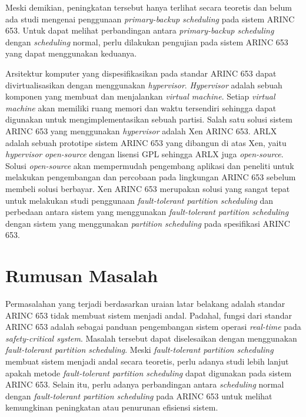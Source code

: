 Meski demikian, peningkatan tersebut hanya terlihat secara teoretis dan belum ada studi mengenai
penggunaan \textit{primary-backup scheduling} pada sistem ARINC 653.  Untuk dapat melihat
perbandingan antara \textit{primary-backup scheduling} dengan \textit{scheduling} normal, perlu
dilakukan pengujian pada sistem ARINC 653 yang dapat menggunakan keduanya.

Arsitektur komputer yang dispesifikasikan pada standar ARINC 653 dapat divirtualisasikan dengan
menggunakan \textit{hypervisor}. \textit{Hypervisor} adalah sebuah komponen yang membuat dan
menjalankan \textit{virtual machine}.  Setiap \textit{virtual machine} akan memiliki ruang
memori dan waktu tersendiri sehingga dapat digunakan untuk mengimplementasikan sebuah partisi.
Salah satu solusi sistem ARINC 653 yang menggunakan \textit{hypervisor} adalah Xen ARINC 653.
ARLX adalah sebuah prototipe sistem ARINC 653 yang dibangun di atas Xen, yaitu
\textit{hypervisor} \textit{open-source} dengan lisensi GPL sehingga ARLX juga
\textit{open-source}.  Solusi \textit{open-source} akan mempermudah pengembang aplikasi dan
peneliti untuk melakukan pengembangan dan percobaan pada lingkungan ARINC 653 sebelum membeli
solusi berbayar. Xen ARINC 653 merupakan solusi yang sangat tepat untuk melakukan studi
penggunaan \textit{fault-tolerant partition scheduling} dan perbedaan antara sistem yang
menggunakan \textit{fault-tolerant partition scheduling} dengan sistem yang menggunakan
\textit{partition scheduling} pada spesifikasi ARINC 653.

\section{Rumusan Masalah}

Permasalahan yang terjadi berdasarkan uraian latar belakang adalah standar ARINC 653 tidak
membuat sistem menjadi andal. Padahal, fungsi dari standar ARINC 653 adalah sebagai panduan
pengembangan sistem operasi \textit{real-time} pada \textit{safety-critical system}.  Masalah
tersebut dapat diselesaikan dengan menggunakan \textit{fault-tolerant partition scheduling}.
Meski \textit{fault-tolerant partition scheduling} membuat sistem menjadi andal secara teoretis,
perlu adanya studi lebih lanjut apakah metode \textit{fault-tolerant partition scheduling} dapat
digunakan pada sistem ARINC 653.  Selain itu, perlu adanya perbandingan antara
\textit{scheduling} normal dengan \textit{fault-tolerant partition scheduling} pada ARINC 653
untuk melihat kemungkinan peningkatan atau penurunan efisiensi sistem.

